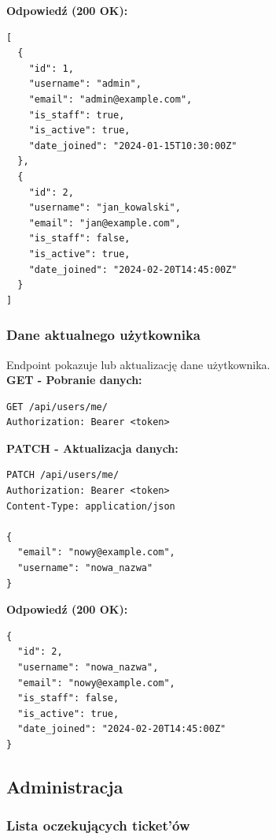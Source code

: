 \documentclass[a4paper,12pt]{article}
\begin{document}
\vspace{0.5cm}

\textbf{Odpowiedź (200 OK):}
\begin{lstlisting}
[
  {
    "id": 1,
    "username": "admin",
    "email": "admin@example.com",
    "is_staff": true,
    "is_active": true,
    "date_joined": "2024-01-15T10:30:00Z"
  },
  {
    "id": 2,
    "username": "jan_kowalski",
    "email": "jan@example.com",
    "is_staff": false,
    "is_active": true,
    "date_joined": "2024-02-20T14:45:00Z"
  }
]
\end{lstlisting}

\newpage

\subsubsection{Dane aktualnego użytkownika}

Endpoint pokazuje lub aktualizację dane użytkownika. \\

\textbf{GET - Pobranie danych:}
\begin{lstlisting}
GET /api/users/me/
Authorization: Bearer <token>
\end{lstlisting}

\vspace{0.5cm}

\textbf{PATCH - Aktualizacja danych:}
\begin{lstlisting}
PATCH /api/users/me/
Authorization: Bearer <token>
Content-Type: application/json

{
  "email": "nowy@example.com",
  "username": "nowa_nazwa"
}
\end{lstlisting}

\vspace{0.5cm}

\textbf{Odpowiedź (200 OK):}
\begin{lstlisting}
{
  "id": 2,
  "username": "nowa_nazwa",
  "email": "nowy@example.com",
  "is_staff": false,
  "is_active": true,
  "date_joined": "2024-02-20T14:45:00Z"
}
\end{lstlisting}

\newpage

\subsection{Administracja}

\subsubsection{Lista oczekujących ticket'ów}
\end{document}
